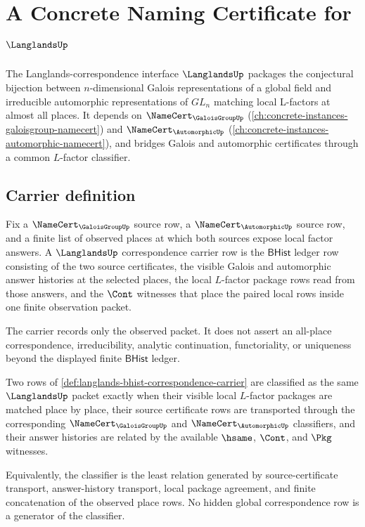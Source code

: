 \chapter{A Concrete Naming Certificate for $\LanglandsUp$}
\label{ch:concrete-instances-langlands-namecert}

The Langlands-correspondence interface $\LanglandsUp$ packages the conjectural bijection between $n$-dimensional Galois representations of a global field and irreducible automorphic representations of $GL_n$ matching local L-factors at almost all places. It depends on $\NameCert_{\GaloisGroupUp}$ (\autoref{ch:concrete-instances-galoisgroup-namecert}) and $\NameCert_{\AutomorphicUp}$ (\autoref{ch:concrete-instances-automorphic-namecert}), and bridges Galois and automorphic certificates through a common $L$-factor classifier.

\section{Carrier definition}
\label{sec:langlands-carrier}

\begin{definition}
\label{def:langlands-bhist-correspondence-carrier}
Fix a $\NameCert_{\GaloisGroupUp}$ source row, a $\NameCert_{\AutomorphicUp}$ source row, and a finite list of observed places at which both sources expose local factor answers. A $\LanglandsUp$ correspondence carrier row is the $\mathsf{BHist}$ ledger row consisting of the two source certificates, the visible Galois and automorphic answer histories at the selected places, the local $L$-factor package rows read from those answers, and the $\Cont$ witnesses that place the paired local rows inside one finite observation packet.

The carrier records only the observed packet. It does not assert an all-place correspondence, irreducibility, analytic continuation, functoriality, or uniqueness beyond the displayed finite $\mathsf{BHist}$ ledger.
\end{definition}

\begin{definition}
\label{def:langlands-lfactor-classifier}
Two rows of \autoref{def:langlands-bhist-correspondence-carrier} are classified as the same $\LanglandsUp$ packet exactly when their visible local $L$-factor packages are matched place by place, their source certificate rows are transported through the corresponding $\NameCert_{\GaloisGroupUp}$ and $\NameCert_{\AutomorphicUp}$ classifiers, and their answer histories are related by the available $\hsame$, $\Cont$, and $\Pkg$ witnesses.

Equivalently, the classifier is the least relation generated by source-certificate transport, answer-history transport, local package agreement, and finite concatenation of the observed place rows. No hidden global correspondence row is a generator of the classifier.
\end{definition}

